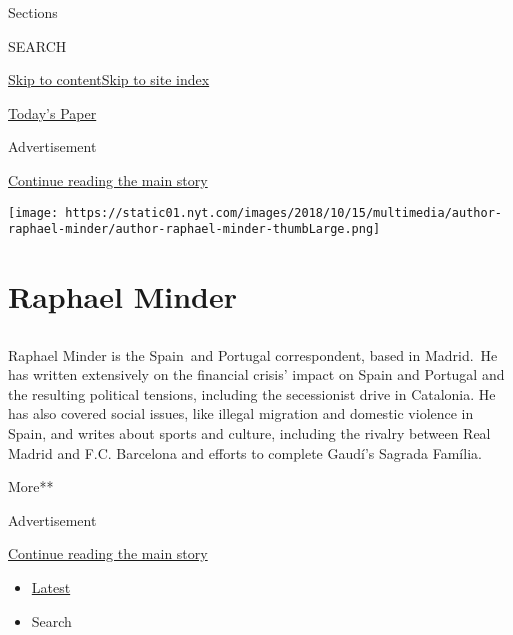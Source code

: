 Sections

SEARCH

\protect\hyperlink{site-content}{Skip to
content}\protect\hyperlink{site-index}{Skip to site index}

\href{https://myaccount.nytimes.com/auth/login?response_type=cookie\&client_id=vi}{}

\href{https://www.nytimes.com/section/todayspaper}{Today's Paper}

Advertisement

\protect\hyperlink{after-top}{Continue reading the main story}

\texttt{[image: https://static01.nyt.com/images/2018/10/15/multimedia/author-raphael-minder/author-raphael-minder-thumbLarge.png]}

\hypertarget{raphael-minder}{%
\section{Raphael Minder}\label{raphael-minder}}

\subsection{}

Raphael Minder is the Spain~and Portugal correspondent, based in
Madrid.~He has written extensively on the financial crisis' impact on
Spain and Portugal and the resulting political tensions, including the
secessionist drive in Catalonia. He has also covered social issues, like
illegal migration and domestic violence in Spain, and writes about
sports and culture, including the rivalry between Real Madrid and F.C.
Barcelona and efforts to complete Gaudí's Sagrada Família.

More**

Advertisement

\protect\hyperlink{after-mid1}{Continue reading the main story}

\begin{itemize}
\tightlist
\item
  \protect\hyperlink{stream-panel}{Latest}
\item
  Search
\end{itemize}

